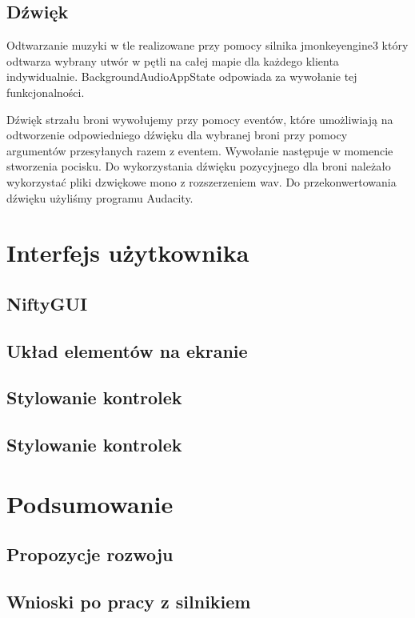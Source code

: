 \documentclass[]{report}
\begin{document}
\section{Dźwięk}
	Odtwarzanie muzyki w tle realizowane przy pomocy silnika jmonkeyengine3 który odtwarza wybrany utwór w pętli na całej mapie dla każdego klienta indywidualnie.
	BackgroundAudioAppState odpowiada za wywołanie tej funkcjonalności.

	Dźwięk strzału broni wywołujemy przy pomocy eventów, które umożliwiają na odtworzenie odpowiedniego dźwięku dla wybranej broni przy pomocy argumentów przesyłanych razem z eventem.
	Wywołanie następuje w momencie stworzenia pocisku.
	Do wykorzystania dźwięku pozycyjnego dla broni należało wykorzystać pliki dzwiękowe mono z rozszerzeniem wav.
	Do przekonwertowania dźwięku użyliśmy programu Audacity.



\chapter*{Interfejs użytkownika}
\section{NiftyGUI}
\section{Układ elementów na ekranie}
\section{Stylowanie kontrolek}
\section{Stylowanie kontrolek}



\chapter*{Podsumowanie}
\section{Propozycje rozwoju}
\section{Wnioski po pracy z silnikiem}
\end{document}
